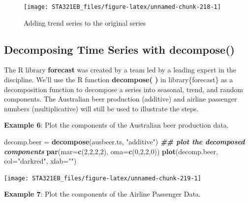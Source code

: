 \documentclass[
]{book}
\newenvironment{Shaded}{\begin{snugshade}}{\end{snugshade}}
\newcommand{\AttributeTok}[1]{\textcolor[rgb]{0.13,0.29,0.53}{#1}}
\newcommand{\DecValTok}[1]{\textcolor[rgb]{0.00,0.00,0.81}{#1}}
\newcommand{\DocumentationTok}[1]{\textcolor[rgb]{0.56,0.35,0.01}{\textbf{\textit{#1}}}}
\newcommand{\FunctionTok}[1]{\textcolor[rgb]{0.13,0.29,0.53}{\textbf{#1}}}
\newcommand{\NormalTok}[1]{#1}
\newcommand{\OtherTok}[1]{\textcolor[rgb]{0.56,0.35,0.01}{#1}}
\newcommand{\StringTok}[1]{\textcolor[rgb]{0.31,0.60,0.02}{#1}}
\begin{document}
\begin{figure}

{\centering \texttt{[image: STA321EB\_files/figure-latex/unnamed-chunk-218-1]} 

}

\caption{Adding trend series to the original series}\label{fig:unnamed-chunk-218}
\end{figure}

\hypertarget{decomposing-time-series-with-decompose}{%
\subsection{\texorpdfstring{Decomposing Time Series with \textbf{decompose()}}{Decomposing Time Series with decompose()}}\label{decomposing-time-series-with-decompose}}

The R library \textbf{forecast} was created by a team led by a leading expert in the discipline. We'll use the R function \textbf{decompose( )} in library\{forecast\} as a decomposition function to decompose a series into seasonal, trend, and random components. The Australian beer production (additive) and airline passenger numbers (multiplicative) will still be used to illustrate the steps.

\textbf{Example 6}: Plot the components of the Australian beer production data.

\begin{Shaded}
\begin{Highlighting}[]
\NormalTok{decomp.beer }\OtherTok{=} \FunctionTok{decompose}\NormalTok{(ausbeer.ts, }\StringTok{"additive"}\NormalTok{)}
\DocumentationTok{\#\# plot the decomposed components}
\FunctionTok{par}\NormalTok{(}\AttributeTok{mar=}\FunctionTok{c}\NormalTok{(}\DecValTok{2}\NormalTok{,}\DecValTok{2}\NormalTok{,}\DecValTok{2}\NormalTok{,}\DecValTok{2}\NormalTok{), }\AttributeTok{oma=}\FunctionTok{c}\NormalTok{(}\DecValTok{0}\NormalTok{,}\DecValTok{2}\NormalTok{,}\DecValTok{2}\NormalTok{,}\DecValTok{0}\NormalTok{))}
\FunctionTok{plot}\NormalTok{(decomp.beer, }\AttributeTok{col=}\StringTok{"darkred"}\NormalTok{, }\AttributeTok{xlab=}\StringTok{""}\NormalTok{)}
\end{Highlighting}
\end{Shaded}

\begin{center}\texttt{[image: STA321EB\_files/figure-latex/unnamed-chunk-219-1]} \end{center}

\textbf{Example 7}: Plot the components of the Airline Passenger Data.
\end{document}
